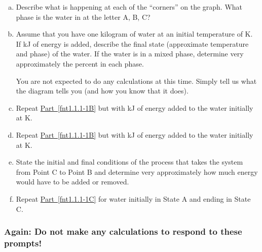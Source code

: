 \begin{enumerate}[(a)]
	\item Describe what is happening at each of the ``corners'' on the graph. What phase is the water in at the letter A, B, C?
	\label{fnt1.1.1-1A}
	
	\item Assume that you have one kilogram of water at an initial temperature of \unit[200]{K}. If \unit[795]{kJ} of energy is added, describe the final state (approximate temperature and phase) of the water. If the water is in a mixed phase, determine very approximately the percent in each phase.
	
		You are not expected to do any calculations at this time. Simply tell us what the diagram tells you (and how you know that it does).
	\label{fnt1.1.1-1B}
	
	\item Repeat \hyperref[fnt1.1.1-1B]{Part~\ref*{fnt1.1.1-1B}} but with \unit[146]{kJ} of energy added to the water initially at \unit[200]{K}.
	
	\item Repeat \hyperref[fnt1.1.1-1B]{Part~\ref*{fnt1.1.1-1B}} but with \unit[1650]{kJ} of energy added to the water initially at \unit[200]{K}.
	
	\item State the initial and final conditions of the process that takes the system from Point C to Point B and determine very approximately how much energy would have to be added or removed.
	\label{fnt1.1.1-1C}
	
	\item Repeat \hyperref[fnt1.1.1-1C]{Part~\ref*{fnt1.1.1-1C}} for water initially in State A and ending in State C.
	\label{fnt1.1.1-1D}
	
\end{enumerate}

\subsubsection*{Again: Do not make any calculations to respond to these prompts!}